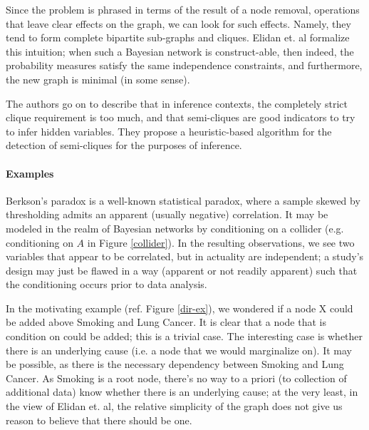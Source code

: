 \documentclass{article}
\begin{document}
	Since the problem is phrased in terms of the result of a node removal, operations that leave clear effects on the graph, we can look for such effects.
	Namely, they tend to form complete bipartite sub-graphs and cliques.
	Elidan et. al\cite{elidanDiscovering2001} formalize this intuition; when such a Bayesian network is construct-able, then indeed, the probability measures satisfy the same independence constraints, and furthermore, the new graph is minimal (in some sense).
	
	The authors go on to describe that in inference contexts, the completely strict clique requirement is too much, and that semi-cliques are good indicators to try to infer hidden variables.
	They propose a heuristic-based algorithm for the detection of semi-cliques for the purposes of inference.
	
	\paragraph{Examples}
	Berkson's paradox is a well-known statistical paradox, where a sample skewed by thresholding admits an apparent (usually negative) correlation.
	It may be modeled in the realm of Bayesian networks by conditioning on a collider (e.g. conditioning on $A$ in Figure \ref{collider}).
	In the resulting observations, we see two variables that appear to be correlated, but in actuality are independent; a study's design may just be flawed in a way (apparent or not readily apparent) such that the conditioning occurs prior to data analysis.
	
	In the motivating example (ref. Figure \ref{dir-ex}), we wondered if a node X could be added above Smoking and Lung Cancer.
	It is clear that a node that is condition on could be added; this is a trivial case.
	The interesting case is whether there is an underlying cause (i.e. a node that we would marginalize on).
	It may be possible, as there is the necessary dependency between Smoking and Lung Cancer.
	As Smoking is a root node, there's no way to a priori (to collection of additional data) know whether there is an underlying cause; at the very least, in the view of Elidan et. al, the relative simplicity of the graph does not give us reason to believe that there should be one.
	
	
\end{document}
